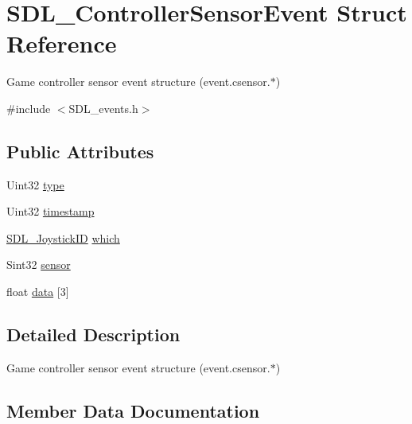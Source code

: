 \hypertarget{struct_s_d_l___controller_sensor_event}{}\section{S\+D\+L\+\_\+\+Controller\+Sensor\+Event Struct Reference}
\label{struct_s_d_l___controller_sensor_event}


Game controller sensor event structure (event.\+csensor.$\ast$)  




{\ttfamily \#include $<$S\+D\+L\+\_\+events.\+h$>$}

\subsection*{Public Attributes}
\begin{DoxyCompactItemize}
\item 
Uint32 \mbox{\hyperlink{struct_s_d_l___controller_sensor_event_a553d55d13d9b118679a3f208c41e96cb}{type}}
\item 
Uint32 \mbox{\hyperlink{struct_s_d_l___controller_sensor_event_a67f4b70a91f347130928f1c91d120e95}{timestamp}}
\item 
\mbox{\hyperlink{_s_d_l__joystick_8h_a3c3d32500cb08f76ee8077983912c0bd}{S\+D\+L\+\_\+\+Joystick\+ID}} \mbox{\hyperlink{struct_s_d_l___controller_sensor_event_acf40e0528d7147725dfc94cc96618d4d}{which}}
\item 
Sint32 \mbox{\hyperlink{struct_s_d_l___controller_sensor_event_aac19e4034212a30d64066a122d5db2a8}{sensor}}
\item 
float \mbox{\hyperlink{struct_s_d_l___controller_sensor_event_a214cbd66e4c8b5e58a60f21faa00e0e7}{data}} \mbox{[}3\mbox{]}
\end{DoxyCompactItemize}


\subsection{Detailed Description}
Game controller sensor event structure (event.\+csensor.$\ast$) 

\subsection{Member Data Documentation}
\mbox{\label{struct_s_d_l___controller_sensor_event_a214cbd66e4c8b5e58a60f21faa00e0e7}} 
